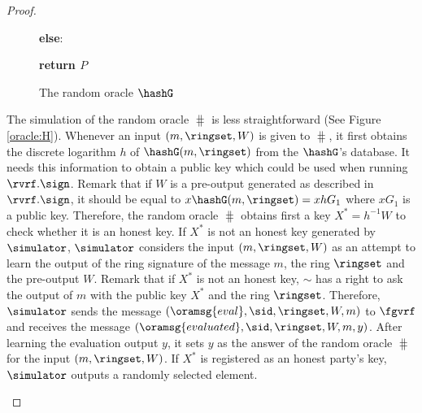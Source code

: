 \begin{proof}
\begin{itemize}
\begin{figure}
{{					
					
					
					
					
					\textbf{else}:
					
					
					
					\textbf{return $ P $}
					
			}}	
			\caption{The random oracle $ \hashG $}
			\label{oracle:Hg}
		\end{figure}
		
		The simulation of the random oracle $ \hash $ is less straightforward (See Figure \ref{oracle:H}). Whenever an input $ (m, \ringset, W) $ is given to $ \hash $, it first obtains the discrete logarithm $ h $ of $ \hashG(m, \ringset) $ from the $ \hashG $'s database. It needs this information to obtain a public key  which could be used when running $ \rvrf.\sign $. Remark that if $ W $ is a pre-output generated as described in $ \rvrf.\sign $, it should be equal to $ x\hashG(m, \ringset)= xhG_1 $  where $ xG_1 $ is a public key. Therefore, the random oracle $ \hash $ obtains first  a  key $ X^* = h^{-1}W $ to check whether it is an honest key. 
		If $ X^*$ is not an honest key generated by $ \simulator $, $ \simulator $ considers the input $ (m,\ringset,W) $ as an attempt to learn the output of the ring signature of the message $ m $, the ring $ \ringset $ and the pre-output $ W $.
		Remark that if $ X^* $ is not an honest key, $ \sim $ has a right to ask the output of $ m $ with the public key $ X^* $ and the ring $ \ringset $. Therefore, $ \simulator $ sends the message $ (\oramsg{eval}, \sid, \ringset,W,m) $ to $ \fgvrf $ and receives the message $ (\oramsg{evaluated}, \sid, \ringset,W,m,y) $.
		After learning the evaluation output $ y $, it sets $ y $ as the answer of the random oracle $ \hash $  for the input $ (m, \ringset, W) $. 
		If $ X^* $ is registered as an honest party's key, $ \simulator $ outputs a randomly selected element. 
		

\end{itemize}
\end{proof}
